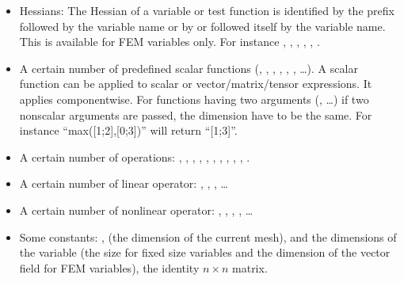 \documentclass[a4paper,11pt,english]{sphinxmanual}
\begin{document}
\begin{itemize}
\item {} 
Hessians: The Hessian of a variable or test function is identified by the prefix  followed by the variable name or by  or  followed itself by the variable name. This is available for FEM variables only. For instance , , , , , .

\item {} 
A certain number of predefined scalar functions (, , , , , , …). A scalar function can be applied to scalar or vector/matrix/tensor expressions. It applies componentwise. For functions having two arguments (,  …) if two non\sphinxhyphen{}scalar arguments are passed, the dimension have to be the same. For instance “max({[}1;2{]},{[}0;3{]})” will return “{[}1;3{]}”.

\item {} 
A certain number of operations: \sphinxcode{\sphinxupquote{+}}, \sphinxcode{\sphinxupquote{\sphinxhyphen{}}}, \sphinxcode{\sphinxupquote{*}}, \sphinxcode{\sphinxupquote{/}}, \sphinxcode{\sphinxupquote{:}}, , , , , \sphinxcode{\sphinxupquote{\textquotesingle{}}}, .

\item {} 
A certain number of linear operator: , , , …

\item {} 
A certain number of nonlinear operator: , , , , …

\item {} 
Some constants: ,  (the dimension of the current mesh),  and  the dimensions of the variable  (the size for fixed size variables and the dimension of the vector field for FEM variables),  the identity \(n\times n\) matrix.


\end{itemize}
\end{document}
